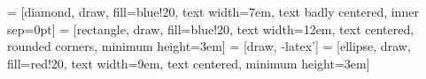 \documentclass[11pt,class=article, crop=false]{standalone}
\begin{document}
 = [diamond, draw, fill=blue!20, text width=7em, text badly centered, inner sep=0pt]
 = [rectangle, draw, fill=blue!20, text width=12em, text centered, rounded corners, minimum height=3em]
 = [draw, -latex']
 = [ellipse, draw, fill=red!20, text width=9em, text centered, minimum height=3em]


\end{document}
